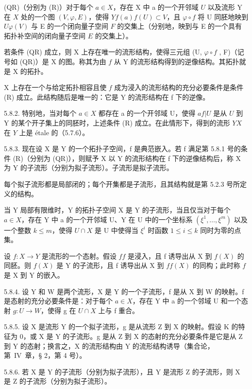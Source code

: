 (QR)（分别为 (R)）对于每个 \(a \in X\)，存在 X 中 a 的一个开邻域 \(U\) 以及流形 Y 在 \(X\) 处的一个图 \((V, \varphi, E)\)，使得 \(Y\)\(f(a)\)\(f(U) \subset V\)，且 \(\varphi \circ f\) 将 U 同胚地映到 \(U\)\(\varphi(V)\) 与 E 的一个闭向量子空间 \(F\) 的交集上（分别地，映到与 E 的一个具有拓扑补空间的闭向量子空间 \(E\) 的交集上）。

若条件 (QR) 成立，则 X 上存在唯一的流形结构，使得三元组 (U, \(\varphi \circ f\) , F)（记号如 (QR)）是 X 的图。称其为由 \(f\) 从 Y 的流形结构得到的逆像结构。其拓扑就是 X 的拓扑。

X 上存在一个与给定拓扑相容且使 \(f\) 成为浸入的流形结构的充分必要条件是条件 (R) 成立。此结构随后是唯一的：它是 Y 的流形结构在 f 下的逆像。

5.8.2. 特别地，当对每个 \(a \in X\) 都存在 a 的一个开邻域 U，使得 \(a\)\(f|U\) 是从 \(U\) 到 Y 的某个开子集上的同胚时，上述条件 (R) 成立。在此情形下，得到的流形 \(Y\)\(X\) 在 \(Y\) 上是 étale 的（5.7.6）。

5.8.3. 现在设 X 是 Y 的一个拓扑子空间，f 是典范嵌入。若 f 满足第 5.8.1 号的条件 (R)（分别为 (QR)），则赋予 X 以 Y 的流形结构在 f 下的逆像结构后，称 X 为 Y 的子流形（分别为拟子流形）。子流形是拟子流形。

每个拟子流形都是局部闭的；每个开集都是子流形，且其结构就是第 5.2.3 号所定义的结构。

当 Y 局部有限维时，Y 的拓扑子空间 X 是 Y 的子流形，当且仅当对于每个 \(a \in X\)，存在 Y 中 a 的一个开邻域 U、Y 在 U 中的一个坐标系 \((\xi^{1}, \ldots, \xi^{m})\) 以及一个整数 \(k \leqslant m\)，使得 \(U \cap X\) 是 U 中使得当 \(\xi^{i}\) 时函数 \(1 \leqslant i \leqslant k\) 同时为零的点集。

设 \(f:X\to Y\) 是流形的一个态射。假设 \(f\)\(f\) 是浸入，且 f 诱导出从 X 到 \(f(X)\) 的同胚。则 \(f(X)\) 是 Y 的子流形，且 f 诱导出从 X 到 \(f\)\(f(X)\) 的同构；此时称 \(f\) 是 X 到 Y 的嵌入。

5.8.4. 设 Y 和 W 是两个流形，X 是 Y 的一个子流形，f 是从 X 到 W 的映射。f 是态射的充分必要条件是：对于每个 \(a \in X\)，存在 Y 中 a 的一个邻域 U 和一个态射 \(g : U \to W\)，使得 g 在 \(U \cap X\) 上与 f 重合。

5.8.5. 设 X 是流形 Y 的一个拟子流形，g 是从流形 Z 到 X 的映射。假设 K 的特征为 0，或 X 是 Y 的子流形。g 是从 Z 到 X 的态射的充分必要条件是它是从 Z 到 Y 的态射；换言之，X 的流形结构由 Y 的流形结构诱导（集合论，第~IV~章，§ 2，第 4 号）。

5.8.6. 若 X 是 Y 的子流形（分别为拟子流形），且 Y 是流形 Z 的子流形，则 X 是 Z 的子流形（分别为拟子流形）。

